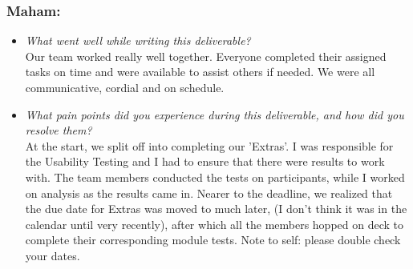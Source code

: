 \documentclass[12pt, titlepage]{article}
\begin{document}
\subsubsection*{Maham:}
\begin{itemize}
  \item \textit{What went well while writing this deliverable?} \\

    Our team worked really well together. Everyone completed their assigned tasks on time and were 
    available to assist others if needed. We were all communicative, cordial and on schedule.

  \item \textit{What pain points did you experience during this
    deliverable, and how did you resolve them?}\\

    At the start, we split off into completing our 'Extras'. I was responsible for the Usability 
  Testing and I had to ensure that there were results to work with. The team members conducted the tests on 
  participants, while I worked on analysis as the results came in. Nearer to the deadline, we realized that the 
  due date for Extras was moved to much later, (I don't think it was in the calendar until very recently), after 
  which all the members hopped on deck to complete their corresponding module tests. Note to self: please double 
  check your dates.

\end{itemize}
\end{document}
